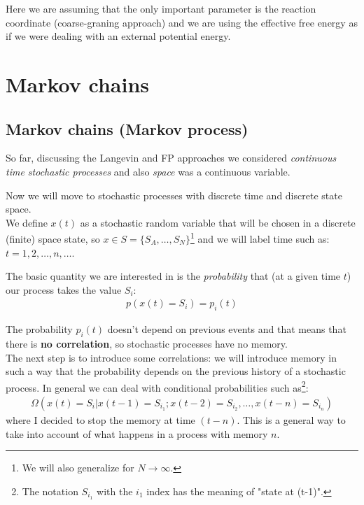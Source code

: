 \documentclass[\main/main.tex]{subfiles}
\begin{document}
Here we are assuming that the only important parameter is the reaction coordinate (coarse-graning approach) and we are using the effective free energy as if we were dealing with an external potential energy.

\chapter{Markov chains}

\section{Markov chains (Markov process)}
So far, discussing the Langevin and FP approaches we considered \textit{continuous time stochastic processes} and also \textit{space} was a continuous variable. 

Now we will move to stochastic processes with discrete time and discrete state space. \\

We define $x(t)$ as a stochastic random variable that will be chosen in a discrete (finite) space state, so $x\in S=\{S_A, \dots, S_N\}$\footnote{We will also generalize for $N\to\infty$.} and we will label time such as: $t=1,2,\dots,n,\dots$.

The basic quantity we are interested in is the \textit{probability} that (at a given time $t$) our process takes the value $S_i$: 
\begin{eqnarray}
p(x(t)=S_i)=p_i(t)
\end{eqnarray}

The probability $p_i(t)$ doesn't depend on previous events and that means that there is \textbf{no correlation}, so stochastic processes have no memory. \\


The next step is to introduce some correlations: we will introduce memory in such a way that the probability depends on the previous history of a stochastic process.
In general we can deal with conditional probabilities such as\footnote{The notation $S_{i_1}$ with the $i_1$ index has the meaning of "state at (t-1)".}:
\begin{eqnarray}
    \Omega(x(t)=S_i|x(t-1)=S_{i_1}; x(t-2)=S_{i_2},\dots,x(t-n)=S_{i_n})
\end{eqnarray}
where I decided to stop the memory at time $(t-n)$. This is a general way to take into account of what happens in a process with memory $n$. \\
\end{document}
